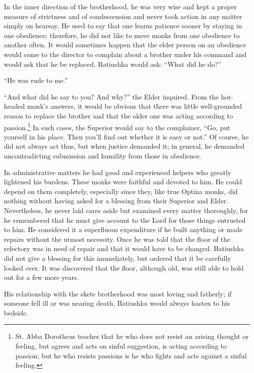 In the inner direction of the brotherhood, he was very wise and kept a proper measure of strictness and of condescension and never took action in any matter simply on hearsay. He used to say that one learns patience sooner by staying in one obedience; therefore, he did not like to move monks from one obedience to another often. It would sometimes happen that the elder person on an obedience would come to the director to complain about a brother under his command and would ask that he be replaced. Batiushka would ask: ``What did he do?''

``He was rude to me.''

``And what did he say to you? And why?'' the Elder inquired. From the hot-headed monk's answers, it would be obvious that there was little well-grounded reason to replace the brother and that the older one was acting according to passion.\footnote{St. Abba Dorotheus teaches that he who does not resist an arising thought or feeling, but agrees and acts on sinful suggestion, is acting according to passion; but he who resists passions is he who fights and acts against a sinful feeling.} In such cases, the Superior would say to the complainer, ``Go, put yourself in his place. Then you'll find out whether it is easy or not.'' Of course, he did not always act thus, but when justice demanded it; in general, he demanded uncontradicting submission and humility from those in obedience.

In administrative matters he had good and experienced helpers who greatly lightened his burdens. These monks were faithful and devoted to him. He could depend on them completely, especially since they, like true Optina monks, did nothing without having asked for a blessing from their Superior and Elder. Nevertheless, he never laid cares aside but examined every matter thoroughly, for he remembered that he must give account to the Lord for those things entrusted to him. He considered it a superfluous expenditure if he built anything or made repairs without the utmost necessity. Once he was told that the floor of the refectory was in need of repair and that it would have to be changed. Batiushka did not give a blessing for this immediately, but ordered that it be carefully looked over. It was discovered that the floor, although old, was still able to hold out for a few more years.

His relationship with the skete brotherhood was most loving and fatherly; if someone fell ill or was nearing death, Batiushka would always hasten to his bedside.

